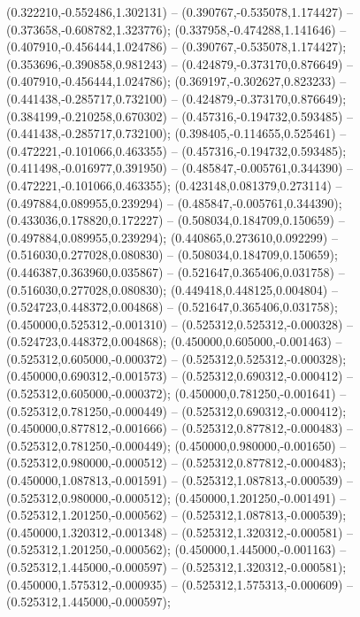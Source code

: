  (0.322210,-0.552486,1.302131) -- (0.390767,-0.535078,1.174427) -- (0.373658,-0.608782,1.323776);
 (0.337958,-0.474288,1.141646) -- (0.407910,-0.456444,1.024786) -- (0.390767,-0.535078,1.174427);
 (0.353696,-0.390858,0.981243) -- (0.424879,-0.373170,0.876649) -- (0.407910,-0.456444,1.024786);
 (0.369197,-0.302627,0.823233) -- (0.441438,-0.285717,0.732100) -- (0.424879,-0.373170,0.876649);
 (0.384199,-0.210258,0.670302) -- (0.457316,-0.194732,0.593485) -- (0.441438,-0.285717,0.732100);
 (0.398405,-0.114655,0.525461) -- (0.472221,-0.101066,0.463355) -- (0.457316,-0.194732,0.593485);
 (0.411498,-0.016977,0.391950) -- (0.485847,-0.005761,0.344390) -- (0.472221,-0.101066,0.463355);
 (0.423148,0.081379,0.273114) -- (0.497884,0.089955,0.239294) -- (0.485847,-0.005761,0.344390);
 (0.433036,0.178820,0.172227) -- (0.508034,0.184709,0.150659) -- (0.497884,0.089955,0.239294);
 (0.440865,0.273610,0.092299) -- (0.516030,0.277028,0.080830) -- (0.508034,0.184709,0.150659);
 (0.446387,0.363960,0.035867) -- (0.521647,0.365406,0.031758) -- (0.516030,0.277028,0.080830);
 (0.449418,0.448125,0.004804) -- (0.524723,0.448372,0.004868) -- (0.521647,0.365406,0.031758);
 (0.450000,0.525312,-0.001310) -- (0.525312,0.525312,-0.000328) -- (0.524723,0.448372,0.004868);
 (0.450000,0.605000,-0.001463) -- (0.525312,0.605000,-0.000372) -- (0.525312,0.525312,-0.000328);
 (0.450000,0.690312,-0.001573) -- (0.525312,0.690312,-0.000412) -- (0.525312,0.605000,-0.000372);
 (0.450000,0.781250,-0.001641) -- (0.525312,0.781250,-0.000449) -- (0.525312,0.690312,-0.000412);
 (0.450000,0.877812,-0.001666) -- (0.525312,0.877812,-0.000483) -- (0.525312,0.781250,-0.000449);
 (0.450000,0.980000,-0.001650) -- (0.525312,0.980000,-0.000512) -- (0.525312,0.877812,-0.000483);
 (0.450000,1.087813,-0.001591) -- (0.525312,1.087813,-0.000539) -- (0.525312,0.980000,-0.000512);
 (0.450000,1.201250,-0.001491) -- (0.525312,1.201250,-0.000562) -- (0.525312,1.087813,-0.000539);
 (0.450000,1.320312,-0.001348) -- (0.525312,1.320312,-0.000581) -- (0.525312,1.201250,-0.000562);
 (0.450000,1.445000,-0.001163) -- (0.525312,1.445000,-0.000597) -- (0.525312,1.320312,-0.000581);
 (0.450000,1.575312,-0.000935) -- (0.525312,1.575313,-0.000609) -- (0.525312,1.445000,-0.000597);

